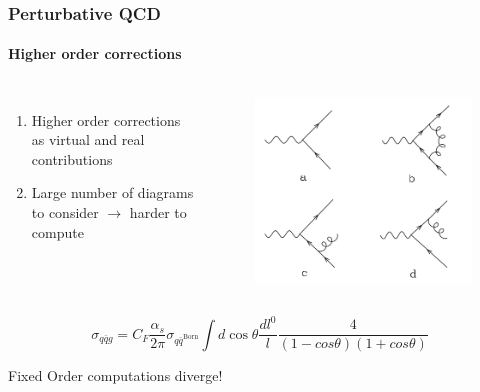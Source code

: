 \documentclass[aspectratio=43]{beamer}
\begin{document}
\begin{frame}

	\frametitle{Perturbative QCD}
	\framesubtitle{Higher order corrections}
	\begin{columns}
	
	
	\begin{enumerate}
		\item Higher order corrections as virtual and real contributions
		\item Large number of diagrams to consider $\rightarrow$ harder to compute
	\end{enumerate}
	
	\begin{figure}[!htb]
		\includegraphics[width = \linewidth]{plots/qcd_corrections.png}
	\end{figure}
	
\end{columns}

\begin{equation}
	\sigma_{q\bar{q}g} = C_{F} \frac{\alpha_{s}}{2\pi} \sigma_{q\bar{q}^{\textrm{Born}}} \int d\cos\theta \frac{dl^{0}}{l} \frac{4}{(1 - cos\theta)(1 + cos\theta)} \nonumber
\end{equation}

	Fixed Order computations diverge!

\end{frame}
\end{document}

